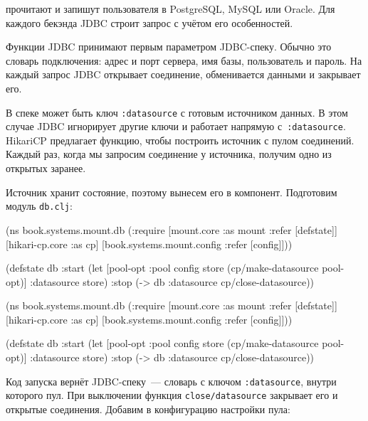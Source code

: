 \noindent
прочитают и запишут пользователя в Postgre\-SQL, MySQL или Oracle. Для каждого
бекэнда JDBC строит запрос с учётом его особенностей.


Функции JDBC принимают первым параметром JDBC-спеку. Обычно это словарь
подключения: адрес и порт сервера, имя базы, пользователь и пароль. На каждый
запрос JDBC открывает соединение, обменивается данными и закрывает его.

В спеке может быть ключ \verb|:datasource| с готовым источником данных. В этом случае
JDBC игнорирует другие ключи и работает напрямую с~\verb|:datasource|. HikariCP
предлагает функцию, чтобы построить источник с пулом соединений. Каждый раз,
когда мы запросим соединение у источника, получим одно из открытых заранее.


Источник хранит состояние, поэтому вынесем его в компонент. Подготовим модуль
\verb|db.clj|:

\ifnarrow

\begin{english}
  \begin{clojure}
(ns book.systems.mount.db
  (:require
   [mount.core :as mount
    :refer [defstate]]
   [hikari-cp.core :as cp]
   [book.systems.mount.config
    :refer [config]]))

(defstate db
  :start
  (let [{pool-opt :pool} config
        store (cp/make-datasource
                pool-opt)]
    {:datasource store})
  :stop
  (-> db
      :datasource
      cp/close-datasource))
  \end{clojure}
\end{english}

\else

\begin{english}
  \begin{clojure}
(ns book.systems.mount.db
  (:require
   [mount.core :as mount :refer [defstate]]
   [hikari-cp.core :as cp]
   [book.systems.mount.config :refer [config]]))

(defstate db
  :start
  (let [{pool-opt :pool} config
        store (cp/make-datasource pool-opt)]
    {:datasource store})
  :stop
  (-> db :datasource cp/close-datasource))
  \end{clojure}
\end{english}

\fi


Код запуска вернёт JDBC-спеку~--- словарь с ключом \texttt{:data\-sour\-ce},
внутри которого пул. При выключении функция \texttt{close\-/datasource} закрывает
его и открытые соединения. Добавим в конфигурацию настройки пула:

